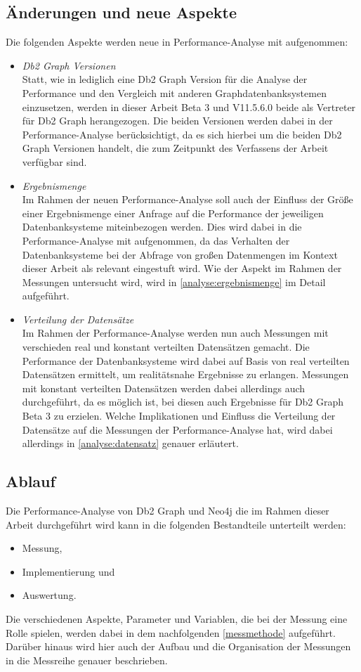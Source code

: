 \subsection{Änderungen und neue Aspekte}
Die folgenden Aspekte werden neue in Performance-Analyse mit aufgenommen:
\begin{itemize}
    \item \textit{Db2 Graph Versionen}\\
    Statt, wie in \cite{sigmod_tian} lediglich eine Db2 Graph Version für die Analyse der Performance und den Vergleich mit anderen Graphdatenbanksystemen einzusetzen, werden in dieser Arbeit Beta 3 und V11.5.6.0 beide als Vertreter für Db2 Graph herangezogen. Die beiden Versionen werden dabei in der Performance-Analyse berücksichtigt, da es sich hierbei um die beiden Db2 Graph Versionen handelt, die zum Zeitpunkt des Verfassens der Arbeit verfügbar sind.
    \item \textit{Ergebnismenge}\\
    Im Rahmen der neuen Performance-Analyse soll auch der Einfluss der Größe einer Ergebnismenge einer Anfrage auf die Performance der jeweiligen Datenbanksysteme miteinbezogen werden. Dies wird dabei in die Performance-Analyse mit aufgenommen, da das Verhalten der Datenbanksysteme bei der Abfrage von großen Datenmengen im Kontext dieser Arbeit als relevant eingestuft wird. Wie der Aspekt im Rahmen der Messungen untersucht wird, wird in \autoref{analyse:ergebnismenge} im Detail aufgeführt.
    \item \textit{Verteilung der Datensätze}\\
    Im Rahmen der Performance-Analyse werden nun auch Messungen mit verschieden real und konstant verteilten Datensätzen gemacht. Die Performance der Datenbanksysteme wird dabei auf Basis von real verteilten Datensätzen ermittelt, um realitätsnahe Ergebnisse zu erlangen. Messungen mit konstant verteilten Datensätzen werden dabei allerdings auch durchgeführt, da es möglich ist, bei diesen auch Ergebnisse für Db2 Graph Beta 3 zu erzielen. Welche Implikationen und Einfluss die Verteilung der Datensätze auf die Messungen der Performance-Analyse hat, wird dabei allerdings in \autoref{analyse:datensatz} genauer erläutert. 
\end{itemize}

\subsection{Ablauf}
Die Performance-Analyse von Db2 Graph und Neo4j die im Rahmen dieser Arbeit durchgeführt wird kann in die folgenden Bestandteile unterteilt werden: 
\begin{itemize}
    \item Messung,
    \item Implementierung und 
    \item Auswertung.
\end{itemize}
Die verschiedenen Aspekte, Parameter und Variablen, die bei der Messung eine Rolle spielen, werden dabei in dem nachfolgenden \autoref{messmethode} aufgeführt. Darüber hinaus wird hier auch der Aufbau und die Organisation der Messungen in die Messreihe genauer beschrieben. 

